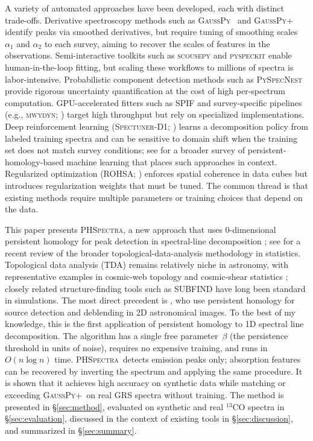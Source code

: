 \documentclass[twocolumn,twocolappendix,aj]{aastex631}
\newcommand{\phspectra}{\textsc{PHSpectra}}
\newcommand{\gausspyp}{\textsc{GaussPy+}}
\newcommand{\gausspy}{\textsc{GaussPy}}
\newcommand{\rohsa}{\textsc{ROHSA}}
\begin{document}
A variety of automated approaches have been developed, each with distinct
trade-offs.  Derivative spectroscopy methods such as \gausspy\
\citep{Lindner2015} and \gausspyp\ \citep{Riener2019} identify peaks via
smoothed derivatives, but require tuning of smoothing scales $\alpha_1$ and
$\alpha_2$ to each survey, aiming to recover the scales of features in the observations.
Semi-interactive
toolkits such as \textsc{scousepy} \citep{Henshaw2016Scousepy} and
\textsc{pyspeckit} \citep{Ginsburg2011} enable human-in-the-loop fitting,
but scaling these workflows to millions of spectra is labor-intensive.
Probabilistic component detection methods such as \textsc{PySpecNest}
\citep{Sokolov2020} provide rigorous uncertainty quantification at the cost
of high per-spectrum computation.  GPU-accelerated fitters such as
\textsc{SPIF} \citep{Colombo2024} and survey-specific pipelines
(e.g., \textsc{mwydyn}; \citealt{Rigby2024}) target high throughput but rely
on specialized implementations.  Deep reinforcement learning
(\textsc{Spectuner-D1}; \citealt{Li2025}) learns a decomposition policy from
labeled training spectra and can be sensitive to domain shift when the
training set does not match survey conditions; see \citet{Pun2022} for a
broader survey of persistent-homology-based machine learning that places
such approaches in context.
Regularized optimization (\rohsa; \citealt{Marchal2019}) enforces spatial
coherence in data cubes but introduces regularization weights that must be
tuned.  The common thread is that existing methods require multiple
parameters or training choices that depend on the data.

This paper presents \phspectra, a new approach that uses
0-dimensional persistent homology for peak detection in spectral-line
decomposition
\citep{Edelsbrunner2002,Zomorodian2005}; see \citet{Wasserman2017} for
a recent review of the broader topological-data-analysis methodology
in statistics.  Topological data analysis (TDA)
remains relatively niche in astronomy, with representative examples in
cosmic-web topology \citep{Xu2019} and cosmic-shear statistics
\citep{Heydenreich2022}; closely related structure-finding tools such as
\textsc{SUBFIND} \citep{Springel2001} have long been standard in simulations.
The most direct precedent is \citet{Shaw2025}, who use persistent homology
for source detection and deblending in 2D astronomical images.
To the best of my knowledge, this is the first application
of persistent homology to 1D spectral line decomposition.  The algorithm has a
single free parameter~$\beta$ (the persistence threshold in units of noise),
requires no expensive training, and runs in $O(n \log n)$ time.  \phspectra\
detects emission peaks only; absorption features can be recovered by
inverting the spectrum and applying the same procedure.  It is shown that it
achieves high accuracy on synthetic data while matching or exceeding
\gausspyp\ on real GRS spectra without training.  The method is presented in
\S\ref{sec:method}, evaluated on synthetic and real ${}^{13}$CO spectra in
\S\ref{sec:evaluation}, discussed in the context of existing tools in
\S\ref{sec:discussion}, and summarized in \S\ref{sec:summary}.
\end{document}
